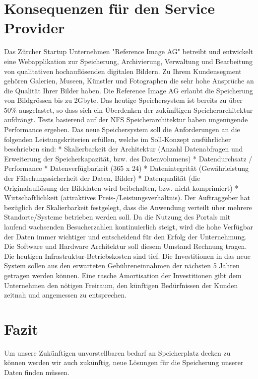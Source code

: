 \section{Konsequenzen für den Service Provider}
Das Zürcher Startup Unternehmen "Reference Image AG" betreibt und entwickelt eine Webapplikation zur Speicherung, Archivierung, Verwaltung und Bearbeitung von qualitativen hochauflösenden digitalen Bildern. Zu Ihrem Kundensegment gehören Galerien, Museen, Künstler und Fotographen die sehr hohe Ansprüche an die Qualität Ihrer Bilder haben. Die Reference Image AG erlaubt die Speicherung von Bildgrössen bis zu 2Gbyte. Das heutige Speichersystem ist bereits zu über 50\% ausgelastet, so dass sich ein Überdenken der zukünftigen Speicherarchitektur aufdrängt. Tests basierend auf der NFS Speicherarchitektur haben ungenügende Performance ergeben. Das neue Speichersystem soll die Anforderungen an die folgenden Leistungskriterien erfüllen, welche im Soll-Konzept ausführlicher beschrieben sind: * Skalierbarkeit der Architektur (Anzahl Datenabfragen und Erweiterung der Speicherkapazität, bzw. des Datenvolumens) * Datendurchsatz / Performance * Datenverfügbarkeit (365 x 24) * Datenintegrität (Gewährleistung der Fälschungssicherheit der Daten, Bilder) * Datenqualität (die Originalauflösung der Bilddaten wird beibehalten, bzw. nicht komprimiert) * Wirtschaftlichkeit (attraktives Preis-/Leistungsverhältnis). Der Auftraggeber hat bezüglich der Skalierbarkeit festgelegt, dass die Anwendung verteilt über mehrere Standorte/Systeme betrieben werden soll. Da die Nutzung des Portals mit laufend wachsenden Besucherzahlen kontinuierlich steigt, wird die hohe Verfügbar der Daten immer wichtiger und entscheidend für den Erfolg der Unternehmung. Die Software und Hardware Architektur soll diesem Umstand Rechnung tragen. Die heutigen Infrastruktur-Betriebskosten sind tief. Die Investitionen in das neue System sollen aus den erwarteten Gebühreneinnahmen der nächsten 5 Jahren getragen werden können. Eine rasche Amortisation der Investitionen gibt dem Unternehmen den nötigen Freiraum, den künftigen Bedürfnissen der Kunden zeitnah und angemessen zu entsprechen. 

\section{Fazit}
Um unsere Zukünftigen unvorstellbaren bedarf an Speicherplatz decken zu können werden wir auch zukünftig, neue Lösungen für die Speicherung unserer Daten finden müssen.

